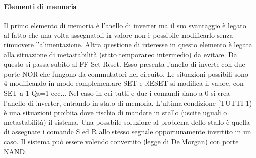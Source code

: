 \documentclass[12pt]{article}
\begin{document}
\paragraph{Elementi di memoria} Il primo elemento di memoria è l'anello di inverter ma il suo svantaggio è legato al fatto che una volta assegnatoli in valore non è possibile modificarlo senza rimuovere l'alimentazione. Altra questione di interesse in questo elemento è legata alla situazione di metastabilità (stato temporaneo intermedio) da evitare. Da questo si passa subito al FF Set Reset. Esso presenta l'anello di inverte con due porte NOR che fungono da commutatori nel circuito. Le situazioni possibili sono 4 modificando in modo complementare SET e RESET si modifica il valore, con SET a 1 Qa=1 ecc... Nel caso in cui tutti e due i comandi siano a 0 si crea l'anello di inverter, entrando in stato di memoria. L'ultima condizione (TUTTI 1) è una situazioni proibita dove rischio di mandare in stallo (uscite uguali o metastabilità) il sistema. Una possibile soluzione al problema dello stallo è quella di assegnare i comando S ed R allo stesso segnale opportunamente invertito in un caso. Il sistema può essere volendo convertito (legge di De Morgan) con porte NAND.
\end{document}
